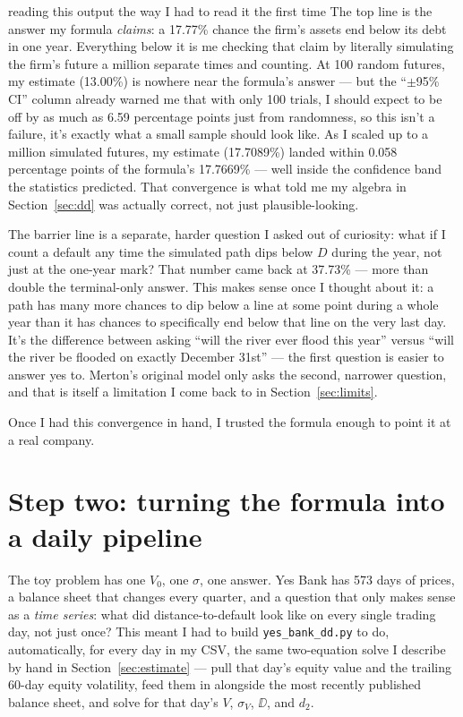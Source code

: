 \begin{defbox}{reading this output the way I had to read it the first time}
The top line is the answer my formula \emph{claims}: a 17.77\% chance the firm's assets end below its debt in one year. Everything below it is me checking that claim by literally simulating the firm's future a million separate times and counting. At 100 random futures, my estimate (13.00\%) is nowhere near the formula's answer — but the ``$\pm$95\% CI'' column already warned me that with only 100 trials, I should expect to be off by as much as 6.59 percentage points just from randomness, so this isn't a failure, it's exactly what a small sample should look like. As I scaled up to a million simulated futures, my estimate (17.7089\%) landed within 0.058 percentage points of the formula's 17.7669\% — well inside the confidence band the statistics predicted. That convergence is what told me my algebra in Section~\ref{sec:dd} was actually correct, not just plausible-looking.

The barrier line is a separate, harder question I asked out of curiosity: what if I count a default any time the simulated path dips below $D$ during the year, not just at the one-year mark? That number came back at 37.73\% — more than double the terminal-only answer. This makes sense once I thought about it: a path has many more chances to dip below a line at some point during a whole year than it has chances to specifically end below that line on the very last day. It's the difference between asking ``will the river ever flood this year'' versus ``will the river be flooded on exactly December 31st'' — the first question is easier to answer yes to. Merton's original model only asks the second, narrower question, and that is itself a limitation I come back to in Section~\ref{sec:limits}.
\end{defbox}

Once I had this convergence in hand, I trusted the formula enough to point it at a real company.

\section{Step two: turning the formula into a daily pipeline}
\label{sec:build-pipeline}

The toy problem has one $V_0$, one $\sigma$, one answer. Yes Bank has 573 days of prices, a balance sheet that changes every quarter, and a question that only makes sense as a \emph{time series}: what did distance-to-default look like on every single trading day, not just once? This meant I had to build \texttt{yes\_bank\_dd.py} to do, automatically, for every day in my CSV, the same two-equation solve I describe by hand in Section~\ref{sec:estimate} — pull that day's equity value and the trailing 60-day equity volatility, feed them in alongside the most recently published balance sheet, and solve for that day's $V$, $\sigma_V$, $\DD$, and $d_2$.

